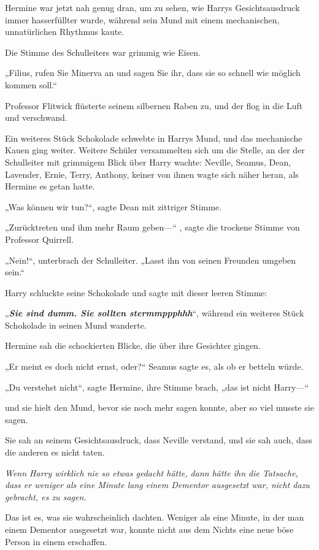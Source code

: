 {Hermine war jetzt nah genug dran, um zu sehen, wie Harrys Gesichtsausdruck immer hasserfüllter wurde, während sein Mund mit einem mechanischen, unnatürlichen Rhythmus kaute.

Die Stimme des Schulleiters war grimmig wie Eisen.

„Filius, rufen Sie Minerva an und sagen Sie ihr, dass sie so schnell wie möglich kommen soll.“

Professor Flitwick flüsterte seinem silbernen Raben zu, und der flog in die Luft und verschwand.

Ein weiteres Stück Schokolade schwebte in Harrys Mund, und das mechanische Kauen ging weiter. Weitere Schüler versammelten sich um die Stelle, an der der Schulleiter mit grimmigem Blick über Harry wachte: Neville, Seamus, Dean, Lavender, Ernie, Terry, Anthony, keiner von ihnen wagte sich näher heran, als Hermine es getan hatte.

„Was können wir tun?“, sagte Dean mit zittriger Stimme.

„Zurücktreten und ihm mehr Raum geben—“ , sagte die trockene Stimme von Professor Quirrell.

„Nein!“, unterbrach der Schulleiter. „Lasst ihn von seinen Freunden umgeben sein.“

Harry schluckte seine Schokolade und sagte mit dieser leeren Stimme:

„\textbf{\emph{Sie sind dumm. Sie sollten stermmppphhh}}“, während ein weiteres Stück Schokolade in seinen Mund wanderte.

Hermine sah die schockierten Blicke, die über ihre Gesichter gingen.

„Er meint es doch nicht ernst, oder?“ Seamus sagte es, als ob er betteln würde.

„Du verstehst nicht“, sagte Hermine, ihre Stimme brach, „das ist nicht Harry—“

und sie hielt den Mund, bevor sie noch mehr sagen konnte, aber so viel musste sie sagen.

Sie sah an seinem Gesichtsausdruck, dass Neville verstand, und sie sah auch, dass die anderen es nicht taten.

\emph{Wenn Harry wirklich nie so etwas gedacht hätte, dann hätte ihn die Tatsache, dass er weniger als eine Minute lang einem Dementor ausgesetzt war, nicht dazu gebracht, es zu sagen.}

Das ist es, was sie wahrscheinlich dachten. Weniger als eine Minute, in der man einem Dementor ausgesetzt war, konnte nicht aus dem Nichts eine neue böse Person in einem erschaffen.

}

